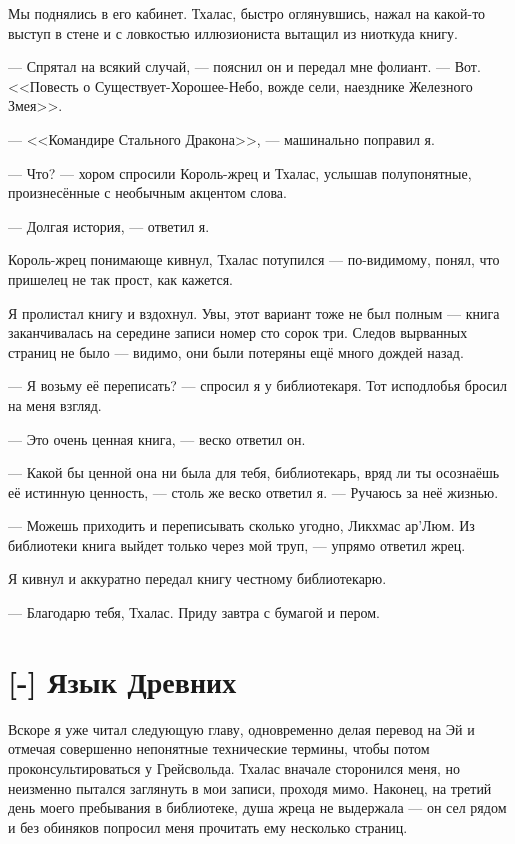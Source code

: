 Мы поднялись в его кабинет.
Тхалас, быстро оглянувшись, нажал на какой-то выступ в стене и с ловкостью иллюзиониста вытащил из ниоткуда книгу.

--- Спрятал на всякий случай, --- пояснил он и передал мне фолиант.
--- Вот.
<<Повесть о Существует-Хорошее-Небо, вожде сели, наезднике Железного Змея>>.

--- <<Командире Стального Дракона>>, --- машинально поправил я.

--- Что? --- хором спросили Король-жрец и Тхалас, услышав полупонятные, произнесённые с необычным акцентом слова.

--- Долгая история, --- ответил я.

Король-жрец понимающе кивнул, Тхалас потупился --- по-видимому, понял, что пришелец не так прост, как кажется.

Я пролистал книгу и вздохнул.
Увы, этот вариант тоже не был полным --- книга заканчивалась на середине записи номер сто сорок три.
Следов вырванных страниц не было --- видимо, они были потеряны ещё много дождей назад.

--- Я возьму её переписать? --- спросил я у библиотекаря.
Тот исподлобья бросил на меня взгляд.

--- Это очень ценная книга, --- веско ответил он.

--- Какой бы ценной она ни была для тебя, библиотекарь, вряд ли ты осознаёшь её истинную ценность, --- столь же веско ответил я.
--- Ручаюсь за неё жизнью.

--- Можешь приходить и переписывать сколько угодно, Ликхмас ар’Люм.
Из библиотеки книга выйдет только через мой труп, --- упрямо ответил жрец.

Я кивнул и аккуратно передал книгу честному библиотекарю.

--- Благодарю тебя, Тхалас.
Приду завтра с бумагой и пером.

\section{[-] Язык Древних}

Вскоре я уже читал следующую главу, одновременно делая перевод на Эй и отмечая совершенно непонятные технические термины, чтобы потом проконсультироваться у Грейсвольда.
Тхалас вначале сторонился меня, но неизменно пытался заглянуть в мои записи, проходя мимо.
Наконец, на третий день моего пребывания в библиотеке, душа жреца не выдержала --- он сел рядом и без обиняков попросил меня прочитать ему несколько страниц.


